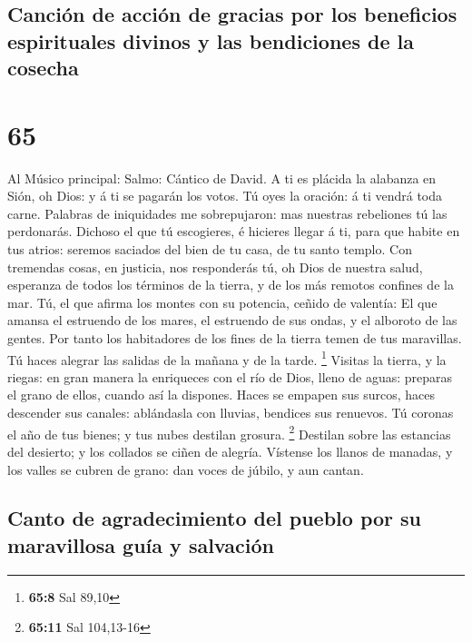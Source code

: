 \hypertarget{canciuxf3n-de-acciuxf3n-de-gracias-por-los-beneficios-espirituales-divinos-y-las-bendiciones-de-la-cosecha}{%
\subsection{Canción de acción de gracias por los beneficios espirituales
divinos y las bendiciones de la
cosecha}\label{canciuxf3n-de-acciuxf3n-de-gracias-por-los-beneficios-espirituales-divinos-y-las-bendiciones-de-la-cosecha}}

\hypertarget{section-64}{%
\section{65}\label{section-64}}

 Al Músico principal: Salmo: Cántico de David. A ti es
plácida la alabanza en Sión, oh Dios: y á ti se pagarán los votos.
 Tú oyes la oración: á ti vendrá toda carne. 
Palabras de iniquidades me sobrepujaron: mas nuestras rebeliones tú las
perdonarás.  Dichoso el que tú escogieres, é hicieres llegar
á ti, para que habite en tus atrios: seremos saciados del bien de tu
casa, de tu santo templo.  Con tremendas cosas, en justicia,
nos responderás tú, oh Dios de nuestra salud, esperanza de todos los
términos de la tierra, y de los más remotos confines de la mar.
 Tú, el que afirma los montes con su potencia, ceñido de
valentía:  El que amansa el estruendo de los mares, el
estruendo de sus ondas, y el alboroto de las gentes.  Por
tanto los habitadores de los fines de la tierra temen de tus maravillas.
Tú haces alegrar las salidas de la mañana y de la tarde. \footnote{\textbf{65:8}
  Sal 89,10}  Visitas la tierra, y la riegas: en gran manera
la enriqueces con el río de Dios, lleno de aguas: preparas el grano de
ellos, cuando así la dispones.  Haces se empapen sus
surcos, haces descender sus canales: ablándasla con lluvias, bendices
sus renuevos.  Tú coronas el año de tus bienes; y tus nubes
destilan grosura. \footnote{\textbf{65:11} Sal 104,13-16} 
Destilan sobre las estancias del desierto; y los collados se ciñen de
alegría.  Vístense los llanos de manadas, y los valles se
cubren de grano: dan voces de júbilo, y aun cantan.

\hypertarget{canto-de-agradecimiento-del-pueblo-por-su-maravillosa-guuxeda-y-salvaciuxf3n}{%
\subsection{Canto de agradecimiento del pueblo por su maravillosa guía y
salvación}\label{canto-de-agradecimiento-del-pueblo-por-su-maravillosa-guuxeda-y-salvaciuxf3n}}

